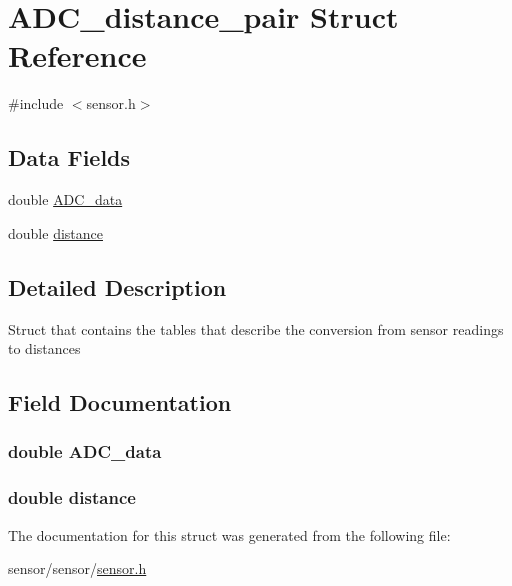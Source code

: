 \hypertarget{struct_a_d_c__distance__pair}{}\section{A\+D\+C\+\_\+distance\+\_\+pair Struct Reference}
\label{struct_a_d_c__distance__pair}


{\ttfamily \#include $<$sensor.\+h$>$}

\subsection*{Data Fields}
\begin{DoxyCompactItemize}
\item 
double \hyperlink{struct_a_d_c__distance__pair_aa001cc67b1ec73e43eb6bd32d24a739b}{A\+D\+C\+\_\+data}
\item 
double \hyperlink{struct_a_d_c__distance__pair_a79b8e036dca6911e3295a47d99f21f43}{distance}
\end{DoxyCompactItemize}


\subsection{Detailed Description}
Struct that contains the tables that describe the conversion from sensor readings to distances 

\subsection{Field Documentation}
\subsubsection[{\texorpdfstring{A\+D\+C\+\_\+data}{ADC_data}}]{\setlength{\rightskip}{0pt plus 5cm}double A\+D\+C\+\_\+data}\hypertarget{struct_a_d_c__distance__pair_aa001cc67b1ec73e43eb6bd32d24a739b}{}\label{struct_a_d_c__distance__pair_aa001cc67b1ec73e43eb6bd32d24a739b}
\subsubsection[{\texorpdfstring{distance}{distance}}]{\setlength{\rightskip}{0pt plus 5cm}double distance}\hypertarget{struct_a_d_c__distance__pair_a79b8e036dca6911e3295a47d99f21f43}{}\label{struct_a_d_c__distance__pair_a79b8e036dca6911e3295a47d99f21f43}


The documentation for this struct was generated from the following file\+:\begin{DoxyCompactItemize}
\item 
sensor/sensor/\hyperlink{sensor_8h}{sensor.\+h}\end{DoxyCompactItemize}
